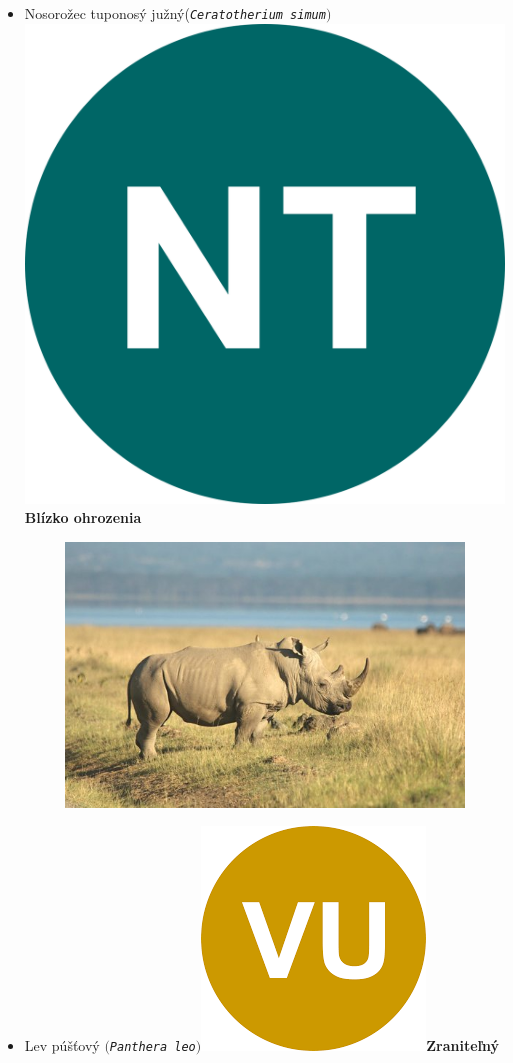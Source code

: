 \documentclass{article}
\begin{document}
\begin{flushright}
\begin{itemize}
\newpage
\item Nosorožec tuponosý južný(\texttt{\textit{Ceratotherium simum}}$)$\includegraphics[scale=0.015]{NT.png}{\color{ForestGreen} \textbf{Blízko ohrozenia}}
\vskip 0.653in
\begin{figure}[h]

\includegraphics[scale=0.005]{nosoroh-masai.jpg}
\end{figure}
\item Lev púšťový $($\texttt{\textit{Panthera leo}}$)$\includegraphics[scale=0.09]{VU.png}{\color{Dandelion}\textbf{Zraniteľný}}


\end{itemize}
\end{flushright}
\end{document}

